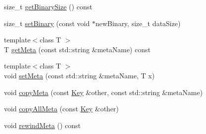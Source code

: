 \begin{DoxyCompactItemize}
size\-\_\-t \hyperlink{classkdb_1_1Key_a6785385e85b731547d9022a0bfd67886}{get\-Binary\-Size} () const 
\begin{DoxyCompactList}\small\item\em \end{DoxyCompactList}\item 
size\-\_\-t \hyperlink{classkdb_1_1Key_ad15b46db781abca132393d93b6668581}{set\-Binary} (const void $\ast$new\-Binary, size\-\_\-t data\-Size)
\begin{DoxyCompactList}\small\item\em \end{DoxyCompactList}\item 
{\footnotesize template$<$class T $>$ }\\T \hyperlink{classkdb_1_1Key_a7a4952f9ee22e6787fc9d43507114612}{get\-Meta} (const std\-::string \&meta\-Name) const 
\begin{DoxyCompactList}\small\item\em \end{DoxyCompactList}\item 
{\footnotesize template$<$class T $>$ }\\void \hyperlink{classkdb_1_1Key_a4c5a3d463127ade0b766c4298002daa3}{set\-Meta} (const std\-::string \&meta\-Name, T x)
\begin{DoxyCompactList}\small\item\em \end{DoxyCompactList}\item 
void \hyperlink{classkdb_1_1Key_a53f6d2196a7f17c4bdc544207bdc5f4c}{copy\-Meta} (const \hyperlink{classkdb_1_1Key}{Key} \&other, const std\-::string \&meta\-Name)
\begin{DoxyCompactList}\small\item\em \end{DoxyCompactList}\item 
void \hyperlink{classkdb_1_1Key_aec0910bf293db33deac6a3f81359cb48}{copy\-All\-Meta} (const \hyperlink{classkdb_1_1Key}{Key} \&other)
\begin{DoxyCompactList}\small\item\em \end{DoxyCompactList}\item 
void \hyperlink{classkdb_1_1Key_adf6171b76e01c2b84c6050d43673dd97}{rewind\-Meta} () const 
\begin{DoxyCompactList}\small\item\em \end{DoxyCompactList}\item 

\end{DoxyCompactItemize}
